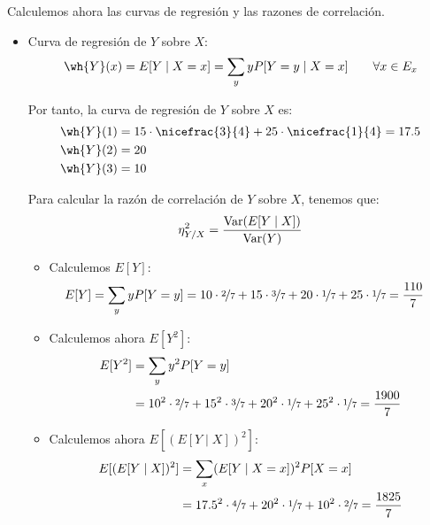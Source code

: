 \begin{ejercicio}
\begin{enumerate}
        Calculemos ahora las curvas de regresión y las razones de correlación.
        \begin{itemize}
            \item Curva de regresión de $Y$ sobre $X$:
            \begin{equation*}
                \wh{Y}(x) = E[Y\mid X = x] = \sum_{y} y P[Y = y\mid X = x] \qquad \forall x\in E_x
            \end{equation*}

            Por tanto, la curva de regresión de $Y$ sobre $X$ es:
            \begin{align*}
                \wh{Y}(1) &= 15\cdot \nicefrac{3}{4} + 25\cdot \nicefrac{1}{4} = 17.5\\
                \wh{Y}(2) &= 20\\
                \wh{Y}(3) &= 10
            \end{align*}

            Para calcular la razón de correlación de $Y$ sobre $X$, tenemos que:
            \begin{equation*}
                \eta^2_{Y/X} = \dfrac{\operatorname{Var}(E[Y\mid X])}{\operatorname{Var}(Y)}
            \end{equation*}
            \begin{itemize}
                \item Calculemos $E[Y]$:
                \begin{align*}
                    E[Y] &= \sum_{y} y P[Y = y]
                    = 10 \cdot \nicefrac{2}{7} + 15 \cdot \nicefrac{3}{7} + 20 \cdot \nicefrac{1}{7} + 25 \cdot \nicefrac{1}{7}
                    = \frac{110}{7}
                \end{align*}

                \item Calculemos ahora $E[Y^2]$:
                \begin{align*}
                    E[Y^2] &= \sum_{y} y^2 P[Y = y]\\
                    &= 10^2 \cdot \nicefrac{2}{7} + 15^2 \cdot \nicefrac{3}{7} + 20^2 \cdot \nicefrac{1}{7} + 25^2 \cdot \nicefrac{1}{7}
                    = \frac{1900}{7}
                \end{align*}

                \item Calculemos ahora $E[(E[Y\mid X])^2]$:
                \begin{align*}
                    E[(E[Y\mid X])^2] &= \sum_{x} (E[Y\mid X = x])^2 P[X = x]\\
                    &= 17.5^2 \cdot \nicefrac{4}{7} + 20^2 \cdot \nicefrac{1}{7} + 10^2 \cdot \nicefrac{2}{7}
                    = \frac{1825}{7}
                \end{align*}


\end{itemize}
\end{itemize}
\end{enumerate}
\end{ejercicio}
